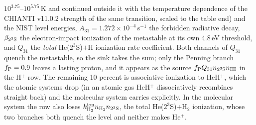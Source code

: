 $10^{3.75}$--$10^{5.75}$\,K and continued outside it with the temperature
dependence of the CHIANTI v11.0.2 strength of the same transition, scaled to
the table end) and the NIST level energies,
$A_{31} = 1.272\times10^{-4}$\,s$^{-1}$ the forbidden radiative
decay, $\beta_{2^3{\rm S}}$ the electron-impact ionization of the
metastable at its own 4.8\,eV threshold, and $Q_{31}$ the \emph{total}
He($2^3$S)$+$H ionization rate coefficient. Both channels of $Q_{31}$
quench the metastable, so the sink takes the sum; only the Penning branch
$f_{\rm P}=0.9$ leaves a lasting proton, and it appears as the source
$f_{\rm P}Q_{31}n_{2^3{\rm S}}n_{\rm HI}$ in the H$^+$ row. The remaining
10 percent is associative ionization to HeH$^+$, which the atomic systems
drop (in an atomic gas HeH$^+$ dissociatively recombines straight back) and
the molecular system carries explicitly. In the molecular system the row
also loses $k^{\rm ion}_{\rm H_2}n_{\rm H_2}n_{2^3{\rm S}}$, the total
He($2^3$S)$+$H$_2$ ionization, whose two branches both quench the level and
neither makes He$^+$.

